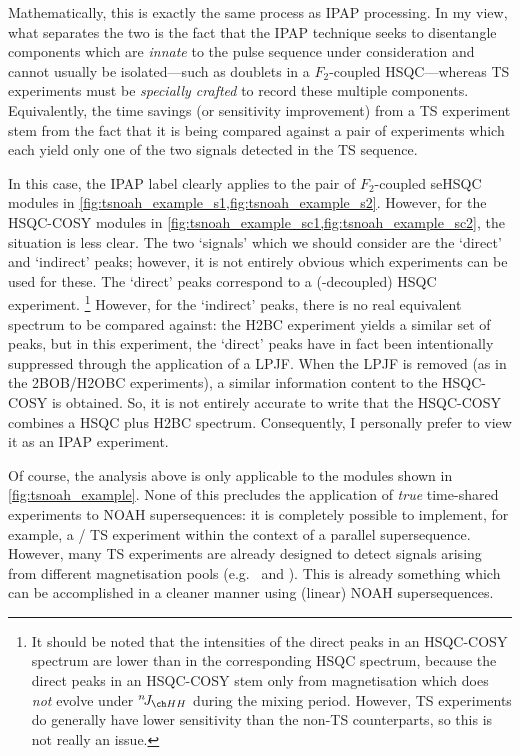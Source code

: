 Mathematically, this is exactly the same process as IPAP processing.
In my view, what separates the two is the fact that the IPAP technique seeks to disentangle components which are \textit{innate} to the pulse sequence under consideration and cannot usually be isolated---such as doublets in a $F_2$-coupled HSQC---whereas TS experiments must be \textit{specially crafted} to record these multiple components.
Equivalently, the time savings (or sensitivity improvement) from a TS experiment stem from the fact that it is being compared against a pair of experiments which each yield only one of the two signals detected in the TS sequence.

In this case, the IPAP label clearly applies to the pair of $F_2$-coupled seHSQC modules in \cref{fig:tsnoah_example_s1,fig:tsnoah_example_s2}.
However, for the HSQC-COSY modules in \cref{fig:tsnoah_example_sc1,fig:tsnoah_example_sc2}, the situation is less clear.
The two `signals' which we should consider are the `direct' and `indirect' peaks; however, it is not entirely obvious which experiments can be used for these.
The `direct' peaks correspond to a (\carbon{}-decoupled) HSQC experiment.%
\footnote{It should be noted that the intensities of the direct peaks in an HSQC-COSY spectrum are lower than in the corresponding HSQC spectrum, because the direct peaks in an HSQC-COSY stem only from magnetisation which does \textit{not} evolve under $\nJ{HH}$ during the mixing period. However, TS experiments do generally have lower sensitivity than the non-TS counterparts, so this is not really an issue.}
However, for the `indirect' peaks, there is no real equivalent spectrum to be compared against: the H2BC experiment\autocite{Nyberg2005JACS,Nyberg2005MRC} yields a similar set of peaks, but in this experiment, the `direct' peaks have in fact been intentionally suppressed through the application of a LPJF.
When the LPJF is removed (as in the 2BOB/H2OBC experiments\autocite{Kupce2017MRC}), a similar information content to the HSQC-COSY is obtained.
So, it is not entirely accurate to write that the HSQC-COSY combines a HSQC plus H2BC spectrum.
Consequently, I personally prefer to view it as an IPAP experiment.

Of course, the analysis above is only applicable to the modules shown in \cref{fig:tsnoah_example}.
None of this precludes the application of \textit{true} time-shared experiments to NOAH supersequences: it is completely possible to implement, for example, a \carbon{}/\nitrogen{} TS experiment within the context of a parallel supersequence.
However, many TS experiments are already designed to detect signals arising from different magnetisation pools (e.g.\  and ).
This is already something which can be accomplished in a cleaner manner using (linear) NOAH supersequences.




